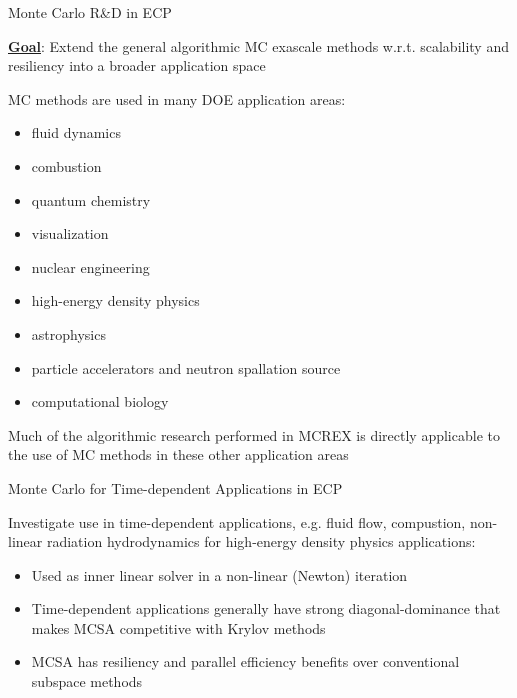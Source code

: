 \documentclass{beamer}
\begin{document}
\begin{frame}{Monte Carlo R\&D in ECP}

  \underline{\bf Goal}: Extend the general algorithmic MC exascale methods
  w.r.t. scalability and resiliency into a broader application space

  \vfill

  MC methods are used in many DOE application areas:
  \begin{itemize}
    \setlength{\itemsep}{-0.2\baselineskip}
  \item fluid dynamics
  \item combustion
  \item quantum chemistry
  \item visualization
  \item nuclear engineering
  \item high-energy density physics
  \item astrophysics
  \item particle accelerators and neutron spallation source
  \item computational biology
  \end{itemize}

  Much of the algorithmic research performed in MCREX is directly applicable
  to the use of MC methods in these other application areas

\end{frame}


\begin{frame}{Monte Carlo for Time-dependent Applications in ECP}

  Investigate use in time-dependent applications, e.g. fluid flow, compustion,
  non-linear radiation hydrodynamics for high-energy density physics
  applications:
  \vfill
  \begin{itemize}
  \item Used as inner linear solver in a non-linear (Newton) iteration
  \vfill
  \item Time-dependent applications generally have strong diagonal-dominance
    that makes MCSA competitive with Krylov methods
  \vfill
  \item MCSA has resiliency and parallel efficiency benefits over conventional
    subspace methods
  \end{itemize}

\end{frame}
\end{document}
